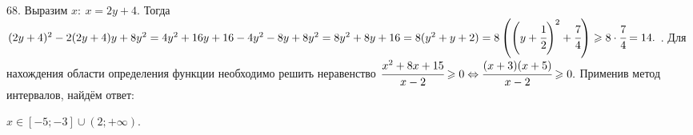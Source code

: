 68. Выразим $x:\ x=2y+4.$ Тогда $(2y+4)^2-2(2y+4)y+8y^2=4y^2+16y+16-4y^2-8y+8y^2=8y^2+8y+16=8(y^2+y+2)=8\left(\left(y+\cfrac{1}{2}\right)^2+\cfrac{7}{4}\right)\geqslant8\cdot\cfrac{7}{4}=14.$\newpage
{}. Для нахождения области определения функции необходимо решить неравенство $\cfrac{x^2+8x+15}{x-2}\geqslant0\Leftrightarrow
\cfrac{(x+3)(x+5)}{x-2}\geqslant0.$ Применив метод интервалов, найдём ответ:
\begin{figure}[ht!]
\end{figure}
$x\in[-5;-3]\cup(2;+\infty).$\\
